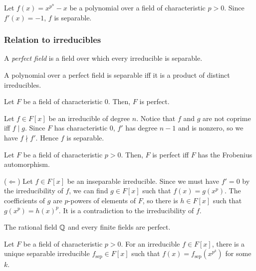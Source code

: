 \documentclass{../exp}
\newcommand{\sep}{\mathrm{sep}}
\begin{document}
\begin{ex}
Let $f(x)=x^{p^n}-x$ be a polynomial over a field of characteristic $p>0$.
Since $f'(x)=-1$, $f$ is separable.
\end{ex}

\subsubsection{Relation to irreducibles}

\begin{defn}
A \emph{perfect field} is a field over which every irreducible is separable.
\end{defn}
\begin{cor}
A polynomial over a perfect field is separable iff it is a product of distinct irreducibles.
\end{cor}

\begin{prop}
Let $F$ be a field of characteristic $0$.
Then, $F$ is perfect.
\end{prop}
\begin{pf}
Let $f\in F[x]$ be an irreducible of degree $n$.
Notice that $f$ and $g$ are not coprime iff $f\mid g$.
Since $F$ has characteristic 0, $f'$ has degree $n-1$ and is nonzero, so we have $f\nmid f'$.
Hence $f$ is separable.
\end{pf}

\begin{prop}
Let $F$ be a field of characteristic $p>0$.
Then, $F$ is perfect iff $F$ has the Frobenius automorphism.
\end{prop}
\begin{pf}
($\Leftarrow$)
Let $f\in F[x]$ be an inseparable irreducible.
Since we must have $f'=0$ by the irreducibility of $f$, we can find $g\in F[x]$ such that $f(x)=g(x^p)$.
The coefficients of $g$ are $p$-powers of elements of $F$, so there is $h\in F[x]$ such that $g(x^p)=h(x)^p$.
It is a contradiction to the irreducibility of $f$.
\end{pf}

\begin{cor}
The rational field $\mathbb{Q}$ and every finite fields are perfect.
\end{cor}
\begin{prop}
Let $F$ be a field of characteristic $p>0$.
For an irreducible $f\in F[x]$, there is a unique separable irreducible $f_\sep\in F[x]$ such that $f(x)=f_\sep(x^{p^k})$ for some $k$.
\end{prop}
\end{document}
